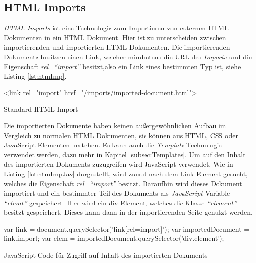 \documentclass[12pt, paper=a4, bibtotoc, toc=listof, headsepline=true]{scrreprt}
\begin{document}
		\subsection{HTML Imports}
		\emph{\ac{HTML} Imports} ist eine Technologie zum Importieren von externen \ac{HTML} Dokumenten in ein \ac{HTML} Dokument. Hier ist zu unterscheiden zwischen importierenden und importierten \ac{HTML} Dokumenten. Die importierenden Dokumente besitzen einen Link, welcher mindestens die \ac{URL} des \emph{Imports} und die Eigenschaft \emph{rel=\enquote{import}} besitzt,also ein Link eines bestimmten Typ ist, siehe Listing \ref{lst:htmImp}.\cite[vgl.]{Glazkov2016} 
		\begin{listing}
			\begin{HTMLcode*}{}
 <link rel="import" href="/imports/imported-document.html">
				\end{HTMLcode*}
			\caption{Standard HTML Import}
			\label{lst:htmImp}
		\end{listing}
		Die importierten Dokumente haben keinen außergewöhnlichen Aufbau im Vergleich zu normalen \ac{HTML} Dokumenten, sie können aus \ac{HTML}, \ac{CSS} oder JavaScript Elementen bestehen. Es kann auch die \emph{Template} Technologie verwendet werden, dazu mehr in Kapitel \ref{subsec:Templates}.
		Um auf den Inhalt des importierten Dokuments zuzugreifen wird JavaScript verwendet. Wie in Listing \ref{lst:htmImpJav} dargestellt, wird zuerst nach dem Link Element gesucht, welches die Eigenschaft \emph{rel=\enquote{import}} besitzt. Daraufhin wird dieses Dokument importiert und ein bestimmter Teil des Dokuments als \emph{JavaScript} Variable \emph{\enquote{elemt}} gespeichert. Hier wird ein div Element, welches die Klasse \emph{\enquote{element}} besitzt gespeichert. Dieses kann dann in der importierenden Seite genutzt werden. 
		\begin{listing}
			\begin{JavaScriptcode*}{}
var link = document.querySelector('link[rel=import]');
var importedDocument = link.import;
var elem = importedDocument.querySelector('div.element');
			\end{JavaScriptcode*}
			\caption{JavaScript Code für Zugriff auf Inhalt des importierten Dokuments}
			\label{lst:htmImpJav}
		\end{listing} 
\end{document}
